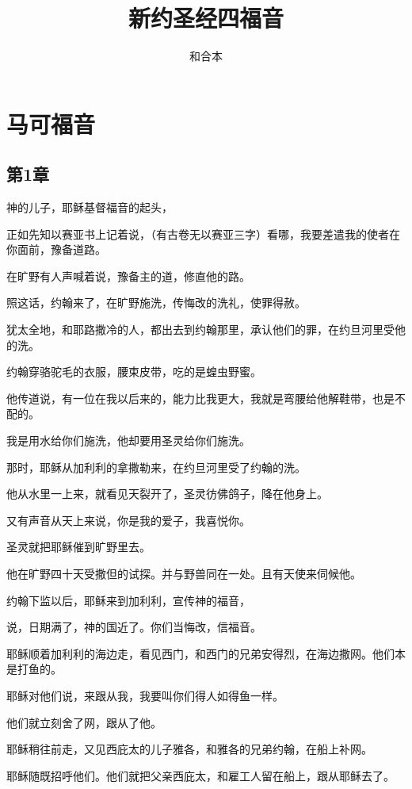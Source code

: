 \documentclass[12pt,oneside]{book}
\title{新约圣经四福音}
\author{和合本}
\begin{document}

\frontmatter


\setcounter{tocdepth}{2}    
\tableofcontents

\mainmatter





\part{马可福音}
\chapter{第1章}
神的儿子，耶稣基督福音的起头，

正如先知以赛亚书上记着说，（有古卷无以赛亚三字）看哪，我要差遣我的使者在你面前，豫备道路。

在旷野有人声喊着说，豫备主的道，修直他的路。

照这话，约翰来了，在旷野施洗，传悔改的洗礼，使罪得赦。

犹太全地，和耶路撒冷的人，都出去到约翰那里，承认他们的罪，在约旦河里受他的洗。

约翰穿骆驼毛的衣服，腰束皮带，吃的是蝗虫野蜜。

他传道说，有一位在我以后来的，能力比我更大，我就是弯腰给他解鞋带，也是不配的。

我是用水给你们施洗，他却要用圣灵给你们施洗。

那时，耶稣从加利利的拿撒勒来，在约旦河里受了约翰的洗。

他从水里一上来，就看见天裂开了，圣灵彷佛鸽子，降在他身上。

又有声音从天上来说，你是我的爱子，我喜悦你。

圣灵就把耶稣催到旷野里去。

他在旷野四十天受撒但的试探。并与野兽同在一处。且有天使来伺候他。

约翰下监以后，耶稣来到加利利，宣传神的福音，

说，日期满了，神的国近了。你们当悔改，信福音。

耶稣顺着加利利的海边走，看见西门，和西门的兄弟安得烈，在海边撒网。他们本是打鱼的。

耶稣对他们说，来跟从我，我要叫你们得人如得鱼一样。

他们就立刻舍了网，跟从了他。

耶稣稍往前走，又见西庇太的儿子雅各，和雅各的兄弟约翰，在船上补网。

耶稣随既招呼他们。他们就把父亲西庇太，和雇工人留在船上，跟从耶稣去了。
\end{document}
